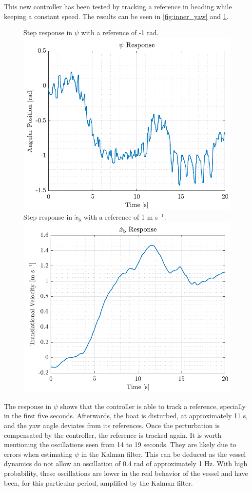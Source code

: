 This new controller has been tested by tracking a reference in heading while keeping a constant speed. The results can be seen in \autoref{fig:inner_yaw} and \ref{fig:inner_xbdot}.
%
\begin{figure}[H]
    \captionbox 
    {   
        Step response in $\psi$ with a reference of -1 rad.
        \label{fig:inner_yaw}
    }                                                                 
    {                                                                  
        \includegraphics[width=.45\textwidth]{figures/inner_yaw}         
    }                                                                    
    \hspace{5pt}                                                          
    \captionbox  
    {      
        Step response in $\dot{x}_\mathrm{b}$ with a reference of 1 m s$^{-1}$.
        \label{fig:inner_xbdot}
    }                                                                          
    {
        \includegraphics[width=.45\textwidth]{figures/inner_xbdot}
    }
\end{figure}

The response in $\psi$ shows that the controller is able to track a reference, specially in the first five seconds. Afterwards, the boat is disturbed, at approximately 11 s, and the yaw angle deviates from its references. Once the perturbation is compensated by the controller, the reference is tracked again. It is worth mentioning the oscillations seen from 14 to 19 seconds. They are likely due to errors when estimating $\psi$ in the Kalman filter. This can be deduced as the vessel dynamics do not allow an oscillation of 0.4 rad of approximately 1 Hz. With high probability, these oscillations are lower in the real behavior of the vessel and have been, for this particular period, amplified by the Kalman filter.

